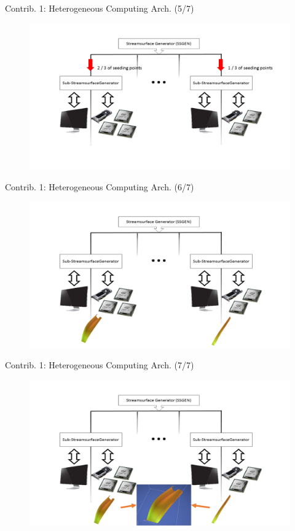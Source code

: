 \documentclass{beamer}
\begin{document}
\begin{frame}{Contrib. 1: Heterogeneous Computing Arch. (5/7)}
	\begin{figure}
		\includegraphics[width=\linewidth]{figures/MAarch5.PNG}
	\end{figure}
\end{frame}

\begin{frame}{Contrib. 1: Heterogeneous Computing Arch. (6/7)}
	\begin{figure}
		\includegraphics[width=\linewidth]{figures/MAarch6.PNG}
	\end{figure}
\end{frame}

\begin{frame}{Contrib. 1: Heterogeneous Computing Arch. (7/7)}
	\begin{figure}
		\includegraphics[width=\linewidth]{figures/MAarch7.PNG}
	\end{figure}
\end{frame}
\end{document}
